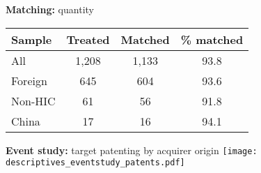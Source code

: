 \documentclass{beamer} %
\begin{document}
\begin{frame}{\textbf{Matching:} quantity}
\begin{table}
\centering
\begin{tabular}{lccc}
	\midrule
	Sample & Treated & Matched & \% matched \\
	\midrule
	All   & 1,208   & 1,133   & 93.8 \\
	Foreign & 645   & 604   & 93.6 \\
	Non-HIC & 61    & 56    & 91.8 \\
	China & 17    & 16     & 94.1 \\
	\midrule
\end{tabular}%
\label{tab:matching_quantity}%
\end{table}%
\vspace{.4cm}
\hfill \hyperlink{unmatched}{}
\end{frame}

\begin{frame}{\textbf{Event study:} target patenting by acquirer origin}
\centering\texttt{[image: descriptives\_eventstudy\_patents.pdf]}
\end{frame}
\end{document}

